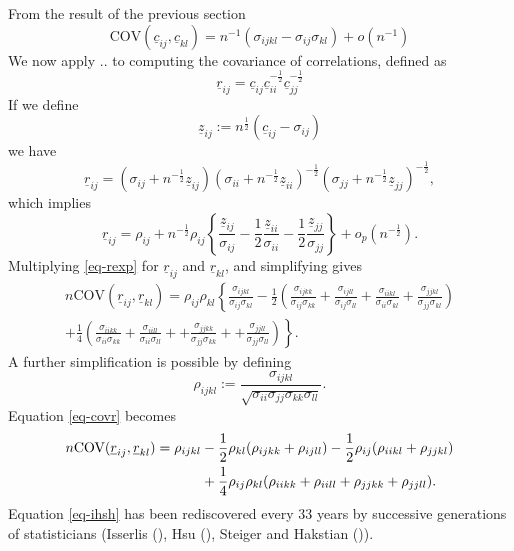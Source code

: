 \documentclass[
  12pt,
  letterpaper,
  DIV=11,
  numbers=noendperiod]{scrartcl}
\newcommand{\ul}[1]{\underline{#1}}
\begin{document}
From the result of the previous section \[
\text{COV}(\ul{c}_{ij},\ul{c}_{kl})=n^{-1}(\sigma_{ijkl}-\sigma_{ij}\sigma_{kl})+o(n^{-1})
\] We now apply .. to computing the covariance of correlations, defined
as \[
\ul{r}_{ij}=\ul{c}_{ij}^{\ }\ul{c}_{ii}^{-\frac12}\ul{c}_{jj}^{-\frac12}
\] If we define \[
\ul{z}_{ij}:=n^\frac12(\ul{c}_{ij}-\sigma_{ij})
\] we have \[
\ul{r}_{ij}=(\sigma_{ij}+n^{-\frac12}\ul{z}_{ij})(\sigma_{ii}+n^{-\frac12}\ul{z}_{ii})^{-\frac12}(\sigma_{jj}+n^{-\frac12}\ul{z}_{jj})^{-\frac12},
\] which implies \begin{equation}
\ul{r}_{ij}=\rho_{ij}+n^{-\frac12}\rho_{ij}\left\{\frac{\ul{z}_{ij}}{\sigma_{ij}}-\frac12\frac{\ul{z}_{ii}}{\sigma_{ii}}-\frac12\frac{\ul{z}_{jj}}{\sigma_{jj}}\right\}+o_p(n^{-\frac12}).\label{eq-rexp}
\end{equation} Multiplying \eqref{eq-rexp} for \(\ul{r}_{ij}\) and
\(\ul{r}_{kl}\), and simplifying gives \begin{multline}
n\text{COV}(\ul{r}_{ij},\ul{r}_{kl})=
\rho_{ij}\rho_{kl}\left\{\frac{\sigma_{ijkl}}{\sigma_{ij}\sigma_{kl}}
-\frac12\left(\frac{\sigma_{ijkk}}{\sigma_{ij}\sigma_{kk}}
+\frac{\sigma_{ijll}}{\sigma_{ij}\sigma_{ll}}
+\frac{\sigma_{iikl}}{\sigma_{ii}\sigma_{kl}}
+\frac{\sigma_{jjkl}}{\sigma_{jj}\sigma_{kl}}\right)\right.\\
\left.+\frac14\left(\frac{\sigma_{iikk}}{\sigma_{ii}\sigma_{kk}}
+\frac{\sigma_{iill}}{\sigma_{ii}\sigma_{ll}}+
+\frac{\sigma_{jjkk}}{\sigma_{jj}\sigma_{kk}}+
+\frac{\sigma_{jjll}}{\sigma_{jj}\sigma_{ll}}\right)\right\}.\label{eq-covr}
\end{multline} A further simplification is possible by defining
\begin{equation}
\rho_{ijkl}:=\frac{\sigma_{ijkl}}{\sqrt{\sigma_{ii}\sigma_{jj}\sigma_{kk}\sigma_{ll}}}.
\label{eq-normcor}
\end{equation} Equation \eqref{eq-covr} becomes \begin{align}
n\text{COV}(\ul{r}_{ij},\ul{r}_{kl})=\rho_{ijkl}&-\frac12\rho_{kl}(\rho_{ijkk}+\rho_{ijll})-\frac12
\rho_{ij}(\rho_{iikl}+\rho_{jjkl})\notag\\&+\frac14\rho_{ij}\rho_{kl}(\rho_{iikk}+\rho_{iill}+\rho_{jjkk}+\rho_{jjll}).\label{eq-ihsh}
\end{align} Equation \eqref{eq-ihsh} has been rediscovered every 33
years by successive generations of statisticians (Isserlis
(), Hsu (),
Steiger and Hakstian ()).
\end{document}
